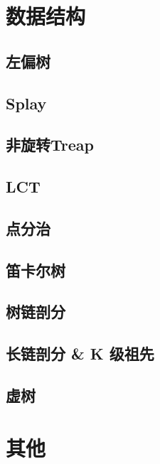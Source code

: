 \documentclass[a4paper,12pt]{article}
\begin{document}
\section{数据结构}

\subsection{左偏树}

\subsection{Splay}

\subsection{非旋转Treap}

\subsection{LCT}


\subsection{点分治}

\subsection{笛卡尔树}

\subsection{树链剖分}

\subsection{长链剖分 \& K 级祖先}

\subsection{虚树}


\section{其他}
\end{document}
